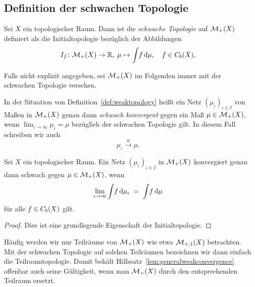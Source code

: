 \documentclass[../main/main.tex]{subfiles}
\begin{document}
	\subsection{Definition der schwachen Topologie}
	
	\begin{Definition}
		\label{def:weaktopology}
		Sei $X$ ein topologischer Raum. Dann ist die \emph{schwache Topologie} auf $\mathcal{M}_{+}(X)$ definiert als die 
		Initialtopologie bezüglich der Abbildungen
		\[ I_f \colon \mathcal{M}_{+}(X) \to \mathbb{R}, \; \mu \mapsto \int_{} \, f \, \mathrm{d}\mu , \quad f \in C_b(X) \text{.} \]
	\end{Definition}

	Falls nicht explizit angegeben, sei $\mathcal{M}_{+}(X)$ im Folgenden immer mit der schwachen Topologie versehen.

	\begin{Definition}
		In der Situation von Definition~\ref{def:weaktopology} heißt ein Netz $(\mu_\iota)_{\iota \in I}$ von Maßen in $\mathcal{M}_{+}(X)$ genau dann 
		\emph{schwach konvergent} gegen ein Maß $\mu \in \mathcal{M}_{+}(X)$, wenn $\lim_{\iota \to \infty} \mu_\iota = \mu$ bezüglich der schwachen Topologie gilt.
		In diesem Fall schreiben wir auch
		\[ \mu_\iota \xrightarrow{w} \mu \text{.} \]
	\end{Definition}

	\begin{Hilfssatz}
		\label{lem:generalweakconvergence}
		Sei $X$ ein topologischer Raum. Ein Netz $(\mu_\iota)_{\iota \in I}$ in $\mathcal{M}_{+}(X)$ konvergiert genau dann schwach gegen $\mu \in \mathcal{M}_{+}(X)$, wenn
		\[ \lim_{\iota \to \infty} \int_{} \, f \, \mathrm{d}\mu_\iota \; = \; \int_{} \, f \, \mathrm{d}\mu \]
		für alle $f \in C_b(X)$ gilt.
	\end{Hilfssatz}

	\begin{proof}
		Dies ist eine grundlegende Eigenschaft der Initialtopologie.
	\end{proof}

	\begin{Bemerkung}
		Häufig werden wir nur Teilräume von $\mathcal{M}_{+}(X)$ wie etwa $\mathcal{M}_{+,1}(X)$ betrachten. Mit der schwachen Topologie auf solchen Teilräumen bezeichnen wir 
		dann einfach die Teilraumtopologie. Damit behält Hilfssatz~\ref{lem:generalweakconvergence} offenbar auch seine Gültigkeit, wenn man $\mathcal{M}_{+}(X)$ durch den 
		entsprechenden Teilraum ersetzt.
	\end{Bemerkung}
\end{document}
